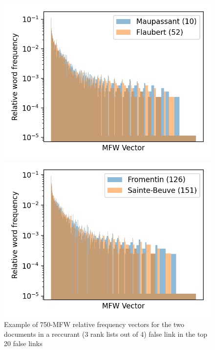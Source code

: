 \begin{figure}
  \centering
  \caption{Example of 750-MFW relative frequency vectors for the two documents in a reccurant (3 rank lists out of 4) false link in the top 20 false links}
  \label{fig:mfw_vector_error}

  \label{fig:mfw_vector_error_0}
  \includegraphics[width=\linewidth]{img/mfw_vector_error_0.png}

  \label{fig:mfw_vector_error_1}
  \includegraphics[width=\linewidth]{img/mfw_vector_error_1.png}
\end{figure}

